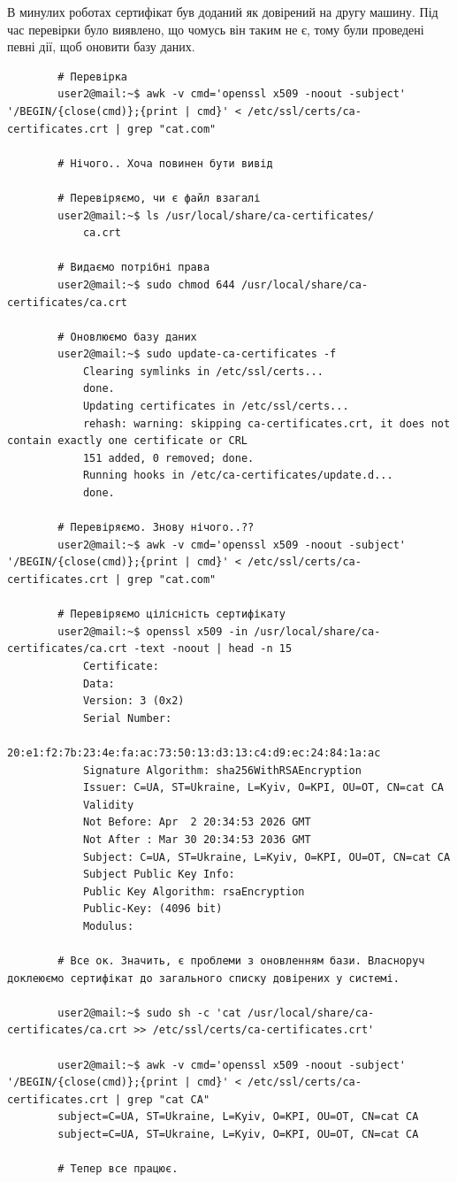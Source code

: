 \documentclass[14pt, a4paper]{extreport}
\begin{document}
	В минулих роботах сертифікат був доданий як довірений на другу машину. Під час перевірки було виявлено, що чомусь він таким не є, тому були проведені певні дії, щоб оновити базу даних. \sideat{[VM 2]}
	
	\begin{verbatim}
		# Перевірка
		user2@mail:~$ awk -v cmd='openssl x509 -noout -subject' '/BEGIN/{close(cmd)};{print | cmd}' < /etc/ssl/certs/ca-certificates.crt | grep "cat.com"
		
		# Нічого.. Хоча повинен бути вивід
		
		# Перевіряємо, чи є файл взагалі
		user2@mail:~$ ls /usr/local/share/ca-certificates/
			ca.crt
		
		# Видаємо потрібні права
		user2@mail:~$ sudo chmod 644 /usr/local/share/ca-certificates/ca.crt
		
		# Оновлюємо базу даних
		user2@mail:~$ sudo update-ca-certificates -f
			Clearing symlinks in /etc/ssl/certs...
			done.
			Updating certificates in /etc/ssl/certs...
			rehash: warning: skipping ca-certificates.crt, it does not contain exactly one certificate or CRL
			151 added, 0 removed; done.
			Running hooks in /etc/ca-certificates/update.d...
			done.
		
		# Перевіряємо. Знову нічого..??
		user2@mail:~$ awk -v cmd='openssl x509 -noout -subject' '/BEGIN/{close(cmd)};{print | cmd}' < /etc/ssl/certs/ca-certificates.crt | grep "cat.com"
		
		# Перевіряємо цілісність сертифікату
		user2@mail:~$ openssl x509 -in /usr/local/share/ca-certificates/ca.crt -text -noout | head -n 15
			Certificate:
			Data:
			Version: 3 (0x2)
			Serial Number:
			20:e1:f2:7b:23:4e:fa:ac:73:50:13:d3:13:c4:d9:ec:24:84:1a:ac
			Signature Algorithm: sha256WithRSAEncryption
			Issuer: C=UA, ST=Ukraine, L=Kyiv, O=KPI, OU=OT, CN=cat CA
			Validity
			Not Before: Apr  2 20:34:53 2026 GMT
			Not After : Mar 30 20:34:53 2036 GMT
			Subject: C=UA, ST=Ukraine, L=Kyiv, O=KPI, OU=OT, CN=cat CA
			Subject Public Key Info:
			Public Key Algorithm: rsaEncryption
			Public-Key: (4096 bit)
			Modulus:
		
		# Все ок. Значить, є проблеми з оновленням бази. Власноруч доклеюємо сертифікат до загального списку довірених у системі.
		
		user2@mail:~$ sudo sh -c 'cat /usr/local/share/ca-certificates/ca.crt >> /etc/ssl/certs/ca-certificates.crt'
		
		user2@mail:~$ awk -v cmd='openssl x509 -noout -subject' '/BEGIN/{close(cmd)};{print | cmd}' < /etc/ssl/certs/ca-certificates.crt | grep "cat CA"
		subject=C=UA, ST=Ukraine, L=Kyiv, O=KPI, OU=OT, CN=cat CA
		subject=C=UA, ST=Ukraine, L=Kyiv, O=KPI, OU=OT, CN=cat CA
		
		# Тепер все працює.
	\end{verbatim}
	
\end{document}
